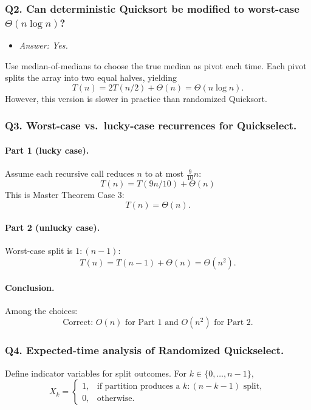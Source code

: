 \documentclass[9pt]{extarticle}
\begin{document}
\subsubsection*{Q2. Can deterministic Quicksort be modified to worst-case $\Theta(n \log n)$?}

\begin{itemize}
    \item \emph{Answer: Yes.}
\end{itemize}
Use median-of-medians to choose the true median as pivot each time.  Each pivot
splits the array into two equal halves, yielding
\[
T(n) = 2T(n/2) + \Theta(n) = \Theta(n \log n).
\]
However, this version is slower in practice than randomized Quicksort.

\subsubsection*{Q3. Worst-case vs.\ lucky-case recurrences for Quickselect.}

\paragraph{Part 1 (lucky case).}
Assume each recursive call reduces $n$ to at most $\tfrac{9}{10}n$:
\[
T(n) = T(9n/10) + \Theta(n)
\]
This is Master Theorem Case 3:
\[
T(n) = \Theta(n).
\]

\paragraph{Part 2 (unlucky case).}
Worst-case split is $1 : (n-1)$:
\[
T(n) = T(n-1) + \Theta(n) = \Theta(n^2).
\]

\paragraph{Conclusion.}
Among the choices:
\[
\boxed{\text{Correct: }O(n)\text{ for Part 1 and }O(n^2)\text{ for Part 2.}}
\]

\subsubsection*{Q4. Expected-time analysis of Randomized Quickselect.}

Define indicator variables for split outcomes.
For $k\in\{0,\dots,n-1\}$,
\[
X_k =
\begin{cases}
1, & \text{if partition produces a }k:(n-k-1)\text{ split},\\
0, & \text{otherwise}.
\end{cases}
\]
\end{document}
